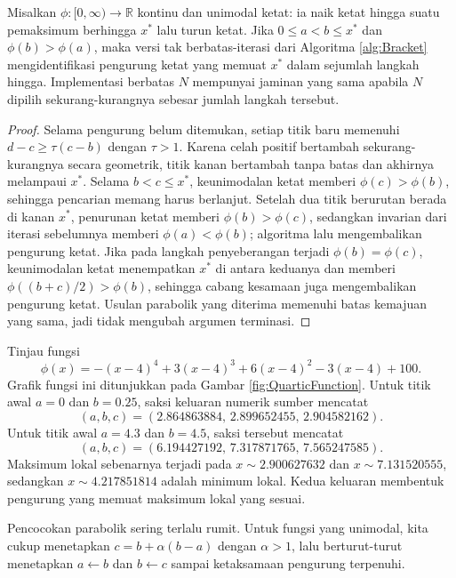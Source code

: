\begin{proposition} Misalkan $\phi:[0,\infty)\to\mathbb{R}$ kontinu dan unimodal ketat: ia naik ketat hingga suatu pemaksimum berhingga $x^*$ lalu turun ketat. Jika $0\leq a<b\leq x^*$ dan $\phi(b)>\phi(a)$, maka versi tak berbatas-iterasi dari Algoritma \ref{alg:Bracket} mengidentifikasi pengurung ketat yang memuat $x^*$ dalam sejumlah langkah hingga. Implementasi berbatas $N$ mempunyai jaminan yang sama apabila $N$ dipilih sekurang-kurangnya sebesar jumlah langkah tersebut.
\end{proposition}
\begin{proof} Selama pengurung belum ditemukan, setiap titik baru memenuhi $d-c\geq\tau(c-b)$ dengan $\tau>1$. Karena celah positif bertambah sekurang-kurangnya secara geometrik, titik kanan bertambah tanpa batas dan akhirnya melampaui $x^*$. Selama $b<c\leq x^*$, keunimodalan ketat memberi $\phi(c)>\phi(b)$, sehingga pencarian memang harus berlanjut. Setelah dua titik berurutan berada di kanan $x^*$, penurunan ketat memberi $\phi(b)>\phi(c)$, sedangkan invarian dari iterasi sebelumnya memberi $\phi(a)<\phi(b)$; algoritma lalu mengembalikan pengurung ketat. Jika pada langkah penyeberangan terjadi $\phi(b)=\phi(c)$, keunimodalan ketat menempatkan $x^*$ di antara keduanya dan memberi $\phi((b+c)/2)>\phi(b)$, sehingga cabang kesamaan juga mengembalikan pengurung ketat. Usulan parabolik yang diterima memenuhi batas kemajuan yang sama, jadi tidak mengubah argumen terminasi.
\end{proof}

\begin{example} Tinjau fungsi
\begin{displaymath}
\phi(x) = -(x-4)^4+3(x-4)^3+6(x-4)^2-3(x-4)+100.
\end{displaymath}
Grafik fungsi ini ditunjukkan pada Gambar \ref{fig:QuarticFunction}.
Untuk titik awal $a=0$ dan $b=0.25$, saksi keluaran numerik sumber mencatat
\[
(a,b,c)=(2.864863884,\,2.899652455,\,2.904582162).
\]
Untuk titik awal $a=4.3$ dan $b=4.5$, saksi tersebut mencatat
\[
(a,b,c)=(6.194427192,\,7.317871765,\,7.565247585).
\]
Maksimum lokal sebenarnya terjadi pada $x\sim2.900627632$ dan $x\sim7.131520555$, sedangkan $x\sim4.217851814$ adalah minimum lokal. Kedua keluaran membentuk pengurung yang memuat maksimum lokal yang sesuai.
\end{example}

\begin{remark} Pencocokan parabolik sering terlalu rumit. Untuk fungsi yang unimodal, kita cukup menetapkan $c=b+\alpha(b-a)$ dengan $\alpha>1$, lalu berturut-turut menetapkan $a\leftarrow b$ dan $b\leftarrow c$ sampai ketaksamaan pengurung terpenuhi.
\label{rem:SimpleBracketing}
\end{remark}

